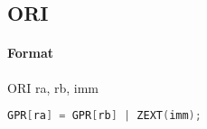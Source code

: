 \subsection{ORI}


\paragraph{Format} ORI ra, rb, imm

\begin{lstlisting}[language=C]
    GPR[ra] = GPR[rb] | ZEXT(imm);
\end{lstlisting}